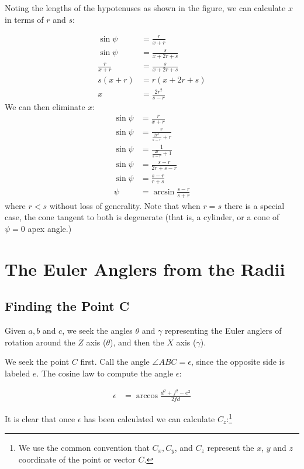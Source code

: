 \documentclass{article}
\begin{document}
Noting the lengths of the hypotenuses as shown in the figure, we
can calculate $x$ in terms of $r$ and $s$:

\begin{align}
  \sin{\psi} &= \frac{r}{x + r} \\
  \sin{\psi} &= \frac{s}{x + 2r + s} \\
  \frac{r}{x + r} &= \frac{s}{x + 2r + s} \\
  s(x + r) &= r(x + 2r + s) \\
  x &= \frac{2r^2}{s - r}
\end{align}
We can then eliminate $x$:
\begin{align}
  \sin{\psi} &= \frac{r}{x + r} \\
  \sin{\psi} &= \frac{r}{\frac{2r^2}{s - r} + r} \\
    \sin{\psi} &= \frac{1}{\frac{2r}{s - r} + 1} \\
      \sin{\psi} &= \frac{s-r}{2r + s - r} \\
    \sin{\psi} &= \frac{s-r}{r + s} \\
 \psi &= \arcsin{\frac{s - r}{s + r}}
\end{align}
where $r < s$ without loss of generality. Note that when $r = s$
there is a special case,
the cone tangent to both is degenerate (that is, a cylinder, or a cone of
$\psi = 0$ apex angle.)


\section{The Euler Anglers from the Radii}

\subsection{Finding the Point C}

Given $a,b$ and $c$, we seek the angles $\theta$ and $\gamma$ representing
the Euler anglers of rotation around the $Z$ axis ($\theta$), and then the $X$ axis ($\gamma$).

We seek the  point $C$ first.
Call the angle $\angle ABC = \epsilon$, since the opposite side
is labeled $e$.
The cosine law to compute the angle $\epsilon$:

\begin{align}
  \epsilon  &= \arccos{\frac{d^2 + f^2 - e^2}{2fd}}
\end{align}

It is clear that once $\epsilon$ has been calculated
we can calculate $C_z$:\footnote{We use the common convention that $C_x, C_y$, and $C_z$ represent the $x$, $y$ and $z$
coordinate of the point or vector $C$.}
\end{document}
